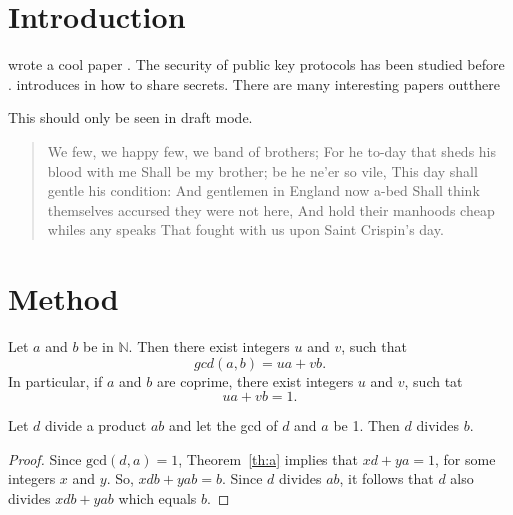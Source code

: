 \mainmatter

\chapter{Introduction}
\nocite{*}
\citeauthor{Shannon1946} wrote a cool paper \citep{Shannon1946}. The security of public key protocols has been studied before \citep{Dolev1983}. \citeauthor{Shamir1979} introduces in \citet{Shamir1979} how to share secrets.
There are many interesting papers outthere \cite{Needham1978,Rivest1978,Merkle1978,Diffie1976,Shannon1949,Ziv1977, Huffman1952, Hamming1950}

\begin{fncycomment}
This should only be seen in draft mode.
\end{fncycomment}

\begin{quote}
We few, we happy few, we band of brothers;
For he to-day that sheds his blood with me
Shall be my brother; be he ne'er so vile,
This day shall gentle his condition:
And gentlemen in England now a-bed
Shall think themselves accursed they were not here,
And hold their manhoods cheap whiles any speaks
That fought with us upon Saint Crispin's day.
\end{quote}

\lipsum
\chapter{Method}

\lipsum

\begin{theorem}\label{th:a}
Let $a$ and $b$ be in $\mathbb{N}$. Then there exist integers $u$ and $v$, such that
\[
gcd(a,b) = ua+vb.
\]
In particular, if $a$ and $b$ are coprime, there exist integers $u$ and $v$, such tat
\[
ua+vb=1.
\]
\end{theorem}

\begin{lemma}\label{lem:a}
Let $d$ divide a product $ab$ and let the gcd of $d$ and $a$ be 1. Then $d$ divides $b$.
\end{lemma}

\begin{proof}
Since $\mathrm{gcd}(d,a)=1$, Theorem~\ref{th:a} implies that $xd + ya = 1$, for some integers $x$ and $y$.
So, $xdb + yab = b$. Since $d$ divides $ab$, it follows that $d$ also divides $xdb + yab$ which equals $b$.
\end{proof}

